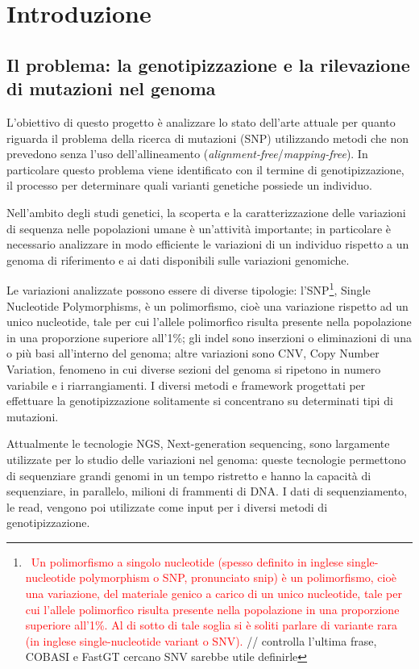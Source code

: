 \documentclass[../main.tex]{subfiles}
\begin{document}
\section{Introduzione}

\subsection{Il problema: la genotipizzazione e la rilevazione di mutazioni nel genoma}

L'obiettivo di questo progetto è analizzare lo stato dell'arte attuale per quanto riguarda il problema della ricerca di mutazioni (SNP) utilizzando metodi che non prevedono senza l'uso dell'allineamento (\textit{alignment-free}/\textit{mapping-free}). In particolare questo problema viene identificato con il termine di genotipizzazione, il processo per determinare quali varianti genetiche possiede un individuo.


Nell'ambito degli studi genetici, la scoperta e la caratterizzazione delle variazioni di sequenza nelle popolazioni umane è un'attività importante; in particolare è necessario analizzare in modo efficiente le variazioni di un individuo rispetto a un genoma di riferimento e ai dati disponibili sulle variazioni genomiche. 


Le variazioni analizzate possono essere di diverse tipologie: l'SNP\footnote{\textcolor{red}{\ Un polimorfismo a singolo nucleotide (spesso definito in inglese single-nucleotide polymorphism o SNP, pronunciato snip) è un polimorfismo, cioè una variazione, del materiale genico a carico di un unico nucleotide, tale per cui l'allele polimorfico risulta presente nella popolazione in una proporzione superiore all'1\%. Al di sotto di tale soglia si è soliti parlare di variante rara (in inglese single-nucleotide variant o SNV).} // controlla l'ultima frase, COBASI e FastGT cercano SNV sarebbe utile definirle}, Single Nucleotide Polymorphisms, è un polimorfismo, cioè una variazione rispetto ad un unico nucleotide, tale per cui l'allele polimorfico risulta presente nella popolazione in una proporzione superiore all'1\%; gli indel sono inserzioni o eliminazioni di una o più basi all'interno del genoma; altre variazioni sono CNV, Copy Number Variation, fenomeno in cui diverse sezioni del genoma si ripetono in numero variabile e i riarrangiamenti. I diversi metodi e framework progettati per effettuare la genotipizzazione solitamente si concentrano su determinati tipi di mutazioni.


Attualmente le tecnologie NGS, Next-generation sequencing, sono largamente utilizzate per lo studio delle variazioni nel genoma: queste tecnologie permettono di sequenziare grandi genomi in un tempo ristretto e hanno la capacità di sequenziare, in parallelo, milioni di frammenti di DNA. I dati di sequenziamento, le read, vengono poi utilizzate come input per i diversi metodi di genotipizzazione.
\end{document}
